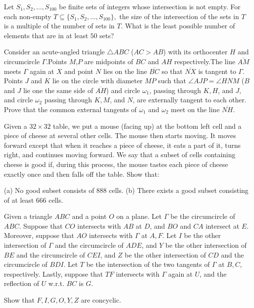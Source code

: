 \documentclass[11pt]{scrartcl}
\begin{document}
\begin{problem}[1978345856029698287]
Let $S_1, S_2, \ldots, S_{100}$ be finite sets of integers whose intersection is not empty. For each non-empty $T \subseteq \{S_1, S_2, \ldots, S_{100}\},$ the size of the intersection of the sets in $T$ is a multiple of the number of sets in $T$. What is the least possible number of elements that are in at least $50$ sets?
\end{problem}
\begin{problem}[1986632843459004559]
Consider an acute-angled triangle $\triangle ABC$ ($AC>AB$) with its orthocenter $H$ and circumcircle $\Gamma$.Points $M$,$P$ are midpoints of $BC$ and $AH$ respectively.The line $\overline{AM}$ meets $\Gamma$ again at $X$ and point $N$ lies on the line $\overline{BC}$ so that $\overline{NX}$ is tangent to $\Gamma$.
Points $J$ and $K$ lie on the circle with diameter $MP$ such that $\angle AJP=\angle HNM$ ($B$ and $J$ lie one the same side of $\overline{AH}$) and circle $\omega_1$, passing through $K,H$, and $J$, and circle $\omega_2$ passing through $K,M$, and $N$, are externally tangent to each other. Prove that the common external tangents of $\omega_1$ and $\omega_2$ meet on the line $\overline{NH}$.
\end{problem}
\begin{problem}[1989615889874190156]
	Given a $32 \times 32$ table, we put a mouse (facing up) at the bottom left cell and a piece of cheese at several other cells. The mouse then starts moving. It moves forward except that when it reaches a piece of cheese, it eats a part of it, turns right, and continues moving forward. We say that a subset of cells containing cheese is good if, during this process, the mouse tastes each piece of cheese exactly once and then falls off the table. Show that:

(a) No good subset consists of 888 cells.
(b) There exists a good subset consisting of at least 666 cells.
\end{problem}
\begin{problem}[2003233604438068678]
Given a triangle $ABC$ and a point $O$ on a plane. Let $\Gamma$ be the circumcircle of $ABC$. Suppose that $CO$ intersects with $AB$ at $D$, and $BO$ and $CA$ intersect at $E$. Moreover, suppose that $AO$ intersects with $\Gamma$ at $A,F$. Let $I$ be the other intersection of $\Gamma$ and the circumcircle of $ADE$, and $Y$ be the other intersection of $BE$ and the circumcircle of $CEI$, and $Z$ be the other intersection of $CD$ and the circumcircle of $BDI$. Let $T$ be the intersection of the two tangents of $\Gamma$ at $B,C$, respectively. Lastly, suppose that $TF$ intersects with $\Gamma$ again at $U$, and the reflection of $U$ w.r.t. $BC$ is $G$.

Show that $F,I,G,O,Y,Z$ are concyclic.
\end{problem}
\end{document}
